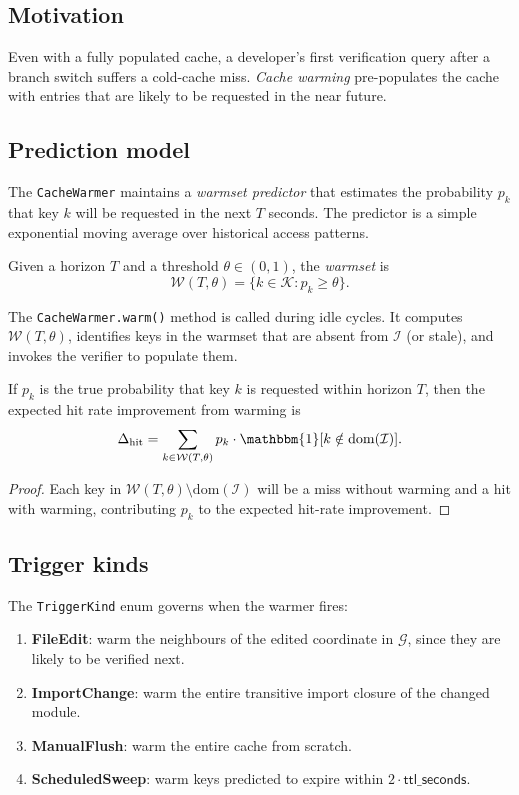 \documentclass[11pt]{article}
\newcommand{\CacheIndex}{\mathcal{I}}              %
\newcommand{\DepGraph}{\mathcal{G}}                %
\newcommand{\warmset}{\mathcal{W}}                 %
\begin{document}
\subsection{Motivation}

Even with a fully populated cache, a developer's first
verification query after a branch switch suffers a cold-cache miss.
\emph{Cache warming} pre-populates the cache with entries that are
likely to be requested in the near future.

\subsection{Prediction model}

The \texttt{CacheWarmer} maintains a \emph{warmset predictor} that
estimates the probability $p_k$ that key $k$ will be requested in the
next $T$ seconds.  The predictor is a simple exponential moving
average over historical access patterns.

\begin{definition}[Warmset]\label{def:warmset}
Given a horizon $T$ and a threshold $\theta \in (0,1)$, the
\emph{warmset} is
\[
  \warmset(T, \theta) = \{k \in \mathcal{K} : p_k \ge \theta\}.
\]
\end{definition}

The \texttt{CacheWarmer.warm()} method is called during idle cycles.
It computes $\warmset(T, \theta)$, identifies keys in the warmset
that are absent from $\CacheIndex$ (or stale), and invokes the
verifier to populate them.

\begin{proposition}\label{prop:warm-hit-rate}
If $p_k$ is the true probability that key $k$ is requested within
horizon $T$, then the expected hit rate improvement from warming is
\[
  \Delta_{\mathrm{hit}} = \sum_{k \in \warmset(T,\theta)} p_k
  \cdot \mathbbm{1}[k \notin \mathrm{dom}(\CacheIndex)].
\]
\end{proposition}
\begin{proof}
Each key in $\warmset(T,\theta) \setminus \mathrm{dom}(\CacheIndex)$
will be a miss without warming and a hit with warming, contributing
$p_k$ to the expected hit-rate improvement.
\end{proof}

\subsection{Trigger kinds}

The \texttt{TriggerKind} enum governs when the warmer fires:
\begin{enumerate}[label=(\roman*)]
\item \textbf{FileEdit}: warm the neighbours of the edited coordinate
  in $\DepGraph$, since they are likely to be verified next.
\item \textbf{ImportChange}: warm the entire transitive import
  closure of the changed module.
\item \textbf{ManualFlush}: warm the entire cache from scratch.
\item \textbf{ScheduledSweep}: warm keys predicted to expire within
  $2 \cdot \mathsf{ttl\_seconds}$.
\end{enumerate}
\end{document}
